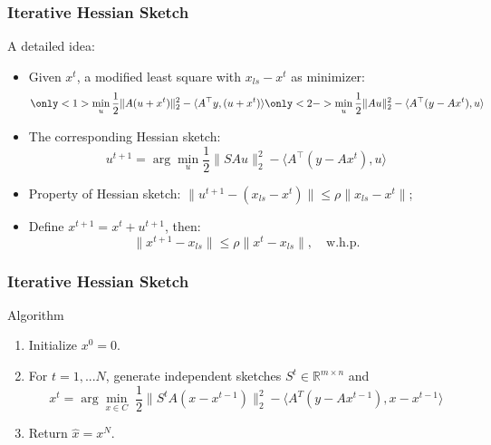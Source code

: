\documentclass{beamer}
\begin{document}
\begin{frame}
    \frametitle{Iterative Hessian Sketch}

    A detailed idea:
    \begin{itemize}
        \item<1-> Given $x^t$, a modified least square with $x_{ls} -
            x^t$ as minimizer:
            \begin{equation*}
                \only<1>{\min_{u} \frac{1}{2} \| A(u + x^t) \|_2^2 - \langle A^\top y,
                (u + x^t) \rangle}
                \only<2->{\min_{u} \frac{1}{2} \| Au \|_2^2 - \langle A^\top (y -
                Ax^t), u \rangle}
            \end{equation*}
        \item<3-> The corresponding Hessian sketch:
            \begin{equation*}
                u^{t+1} = \arg\min_{u} \frac{1}{2} \| SAu \|_2^2 - \langle A^\top (y - Ax^t), u \rangle
            \end{equation*}
        \item<4-> Property of Hessian sketch: $\|u^{t+1} - (x_{ls} - x^t)\|
            \leq \rho \|x_{ls} - x^t\|$;
        \item<5-> Define $x^{t+1} = x^t + u^{t+1}$, then:
            \begin{equation*}
                \|x^{t+1} - x_{ls}\| \leq \rho \|x^t - x_{ls}\|,
                \quad \text{w.h.p.}
            \end{equation*}
 
    \end{itemize}
\end{frame}

\begin{frame}
    \frametitle{Iterative Hessian Sketch}
    \begin{block}{Algorithm}
        \begin{enumerate}
            \item Initialize $x^0 = 0$.\\
            \item For $t=1,...N$, generate independent sketches $S^t \in
                \mathbb{R}^{m \times n}$ and
                \begin{equation*}
                    x^t = \arg\min_{x \in C} \; \frac{1}{2} \| S^t A(x -
                    x^{t-1})\|^2_2 - \langle A^T(y-A x^{t-1}), x - x^{t-1} \rangle
                \end{equation*}
            \item Return $\hat{x} = x^N$.  
        \end{enumerate}
    \end{block}
\end{frame}
\end{document}
